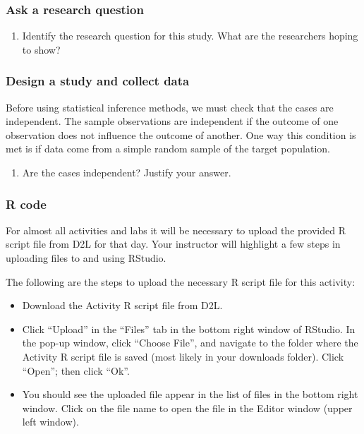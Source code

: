 \documentclass[
]{report}
\providecommand{\tightlist}{%
  \setlength{\itemsep}{0pt}\setlength{\parskip}{0pt}}
\begin{document}
\subsubsection*{Ask a research question}\label{ask-a-research-question}

\begin{enumerate}
\def\labelenumi{\arabic{enumi}.}
\tightlist
\item
  Identify the research question for this study. What are the researchers hoping to show?
\end{enumerate}

\vspace{0.6in}

\subsubsection*{Design a study and collect data}\label{design-a-study-and-collect-data}

Before using statistical inference methods, we must check that the cases are independent. The sample observations are independent if the outcome of one observation does not influence the outcome of another. One way this condition is met is if data come from a simple random sample of the target population.

\begin{enumerate}
\def\labelenumi{\arabic{enumi}.}
\setcounter{enumi}{1}
\tightlist
\item
  Are the cases independent? Justify your answer.
\end{enumerate}

\vspace{0.8in}

\subsubsection*{R code}\label{r-code}

For almost all activities and labs it will be necessary to upload the provided R script file from D2L for that day. Your instructor will highlight a few steps in uploading files to and using RStudio.

The following are the steps to upload the necessary R script file for this activity:

\begin{itemize}
\item
  Download the Activity R script file from D2L.
\item
  Click ``Upload'' in the ``Files'' tab in the bottom right window of RStudio. In the pop-up window, click ``Choose File'', and navigate to the folder where the Activity R script file is saved (most likely in your downloads folder). Click ``Open''; then click ``Ok''.
\item
  You should see the uploaded file appear in the list of files in the bottom right window. Click on the file name to open the file in the Editor window (upper left window).
\end{itemize}
\end{document}
